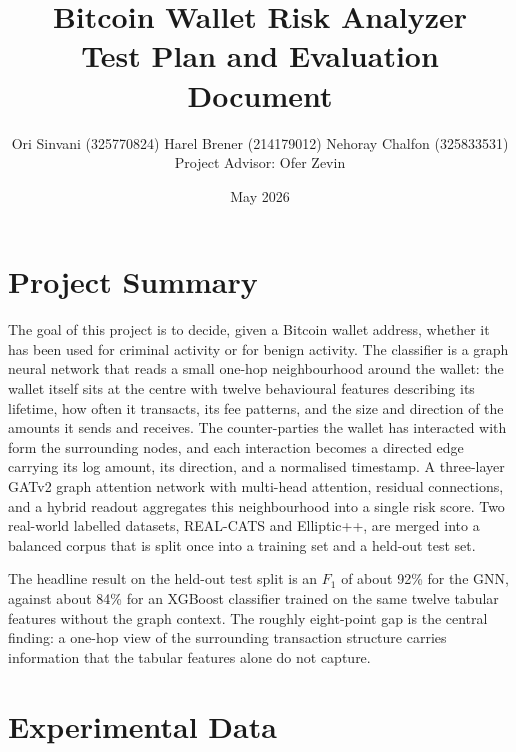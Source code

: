 \documentclass[11pt]{article}
\title{\vspace{-1.2cm}Bitcoin Wallet Risk Analyzer\\[2pt]\large Test Plan and Evaluation Document}
\author{Ori Sinvani \textnormal{(325770824)} \quad Harel Brener \textnormal{(214179012)} \quad Nehoray Chalfon \textnormal{(325833531)}\\[3pt]
\normalsize\normalfont Project Advisor: Ofer Zevin}
\date{May 2026}
\begin{document}
\maketitle
\vspace{-0.6cm}

\section{Project Summary}

The goal of this project is to decide, given a Bitcoin wallet address, whether it has been used for criminal
activity or for benign activity. The classifier is a graph neural network that reads a small one-hop neighbourhood
around the wallet: the wallet itself sits at the centre with twelve behavioural features describing its lifetime,
how often it transacts, its fee patterns, and the size and direction of the amounts it sends and receives. The
counter-parties the wallet has interacted with form the surrounding nodes, and each interaction becomes a directed
edge carrying its log amount, its direction, and a normalised timestamp. A three-layer GATv2 graph attention
network with multi-head attention, residual connections, and a hybrid readout aggregates this neighbourhood into a
single risk score. Two real-world labelled datasets, REAL-CATS and Elliptic++, are merged into a balanced corpus
that is split once into a training set and a held-out test set.

The headline result on the held-out test split is an $F_1$ of about 92\% for the GNN, against about 84\% for an
XGBoost classifier trained on the same twelve tabular features without the graph context. The roughly eight-point
gap is the central finding: a one-hop view of the surrounding transaction structure carries information that the
tabular features alone do not capture.

\section{Experimental Data}\label{sec:data}
\end{document}

